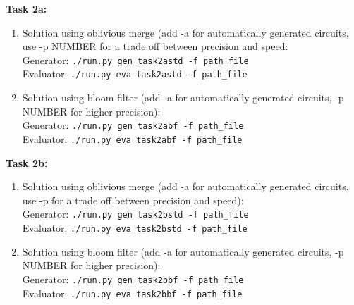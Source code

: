 \documentclass[11pt]{article}
\begin{document}
\noindent\textbf{Task 2a:}\\
\begin{enumerate}
\item Solution using oblivious merge (add -a for automatically generated circuits, use -p NUMBER for a trade off between precision and speed:\\
Generator: {\tt ./run.py gen task2astd -f path\_file}\\
Evaluator: {\tt ./run.py eva task2astd -f path\_file}

\item Solution using bloom filter (add -a for automatically generated circuits, -p NUMBER for higher precision):\\
Generator: {\tt ./run.py gen task2abf -f path\_file}\\
Evaluator: {\tt ./run.py eva task2abf -f path\_file}

\end{enumerate}


\noindent\textbf{Task 2b:}\\
\begin{enumerate}
\item Solution using oblivious merge (add -a for automatically generated circuits, use -p for a trade off between precision and speed):\\
Generator: {\tt ./run.py gen task2bstd -f path\_file}\\
Evaluator: {\tt ./run.py eva task2bstd -f path\_file}

\item Solution using bloom filter (add -a for automatically generated circuits, -p NUMBER for higher precision):\\
Generator: {\tt ./run.py gen task2bbf -f path\_file}\\
Evaluator: {\tt ./run.py eva task2bbf -f path\_file}
\end{enumerate}
\begin{comment}



task2a:
---------------------
 -  

 -  

task2b:
---------------------
 -  




 -  
\end{comment}


\end{document}
